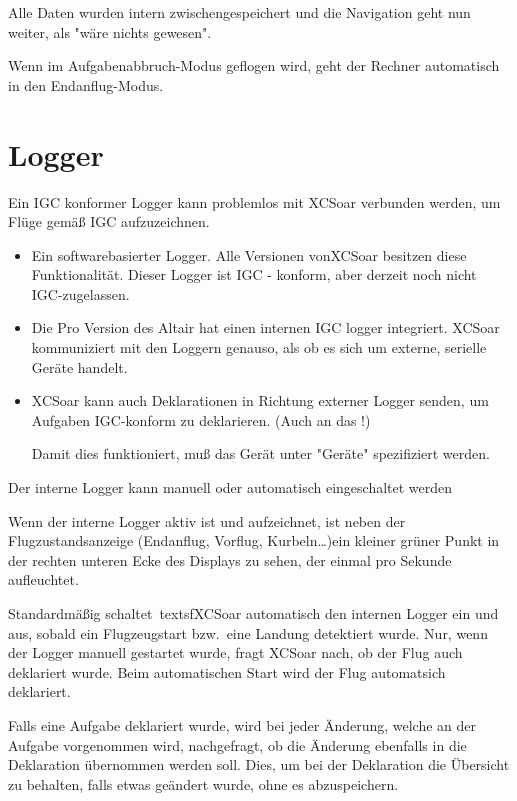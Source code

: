 Alle Daten wurden intern zwischengespeichert und die Navigation geht nun weiter, als "wäre nichts gewesen".

\textcolor[rgb]{0.00,0.25,0.50}{\textsf{Wenn im Aufgabenabbruch-Modus geflogen wird, geht der \achtung Rechner automatisch in den  Endanflug-Modus.}}
%
\section{Logger}

Ein IGC konformer Logger kann problemlos mit \textsf{XCSoar} verbunden werden, um Flüge gemäß IGC aufzuzeichnen.  

\begin{itemize}
\item Ein softwarebasierter Logger.  Alle Versionen von\textsf{XCSoar}  besitzen diese Funktionalität.  Dieser Logger ist IGC - konform, aber derzeit noch nicht IGC-zugelassen.
\item Die Pro Version des Altair hat einen internen IGC logger integriert.
\textsf{XCSoar} kommuniziert mit den Loggern genauso, als ob es sich um externe, serielle Geräte handelt.
\item\textsf{XCSoar} kann auch Deklarationen in Richtung externer Logger senden, um Aufgaben IGC-konform zu deklarieren. (Auch an das \fl!)

Damit dies funktioniert, muß das Gerät unter "Geräte" spezifiziert werden. 
\end{itemize}

Der interne Logger kann manuell oder automatisch eingeschaltet werden

Wenn der interne Logger aktiv ist und aufzeichnet, ist neben der Flugzustandsanzeige (Endanflug, Vorflug, Kurbeln\dots)ein kleiner grüner Punkt
in der rechten unteren Ecke des Displays zu sehen, der einmal pro Sekunde aufleuchtet.


Standardmäßig schaltet\ textsf{XCSoar}  automatisch den internen Logger ein und aus, sobald ein Flugzeugstart bzw.\ eine Landung  detektiert wurde.
Nur, wenn der Logger manuell gestartet wurde, fragt \textsf{XCSoar} nach, ob der Flug auch deklariert wurde. Beim automatischen Start wird der Flug automatsich deklariert.

Falls eine Aufgabe deklariert wurde, wird bei jeder Änderung, welche an der Aufgabe vorgenommen wird, nachgefragt, ob die Änderung ebenfalls in die Deklaration übernommen werden soll. Dies, um bei der Deklaration die Übersicht zu behalten, falls etwas geändert wurde, ohne es abzuspeichern.

